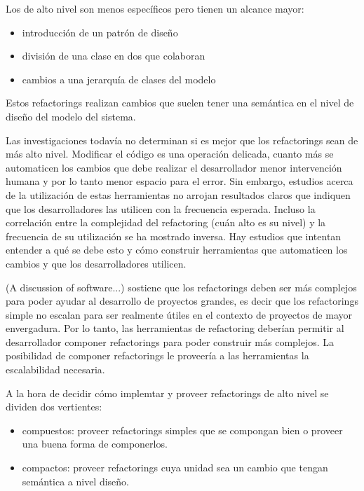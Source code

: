 Los de alto nivel son menos específicos pero tienen un alcance mayor:

\begin{itemize}
    \item introducción de un patrón de diseño
    \item división de una clase en dos que colaboran
    \item cambios a una jerarquía de clases del modelo
\end{itemize}

Estos refactorings realizan cambios que suelen tener una semántica en el nivel de diseño del modelo
del sistema.

Las investigaciones todavía no determinan si es mejor que los refactorings sean de más alto nivel.
Modificar el código es una operación delicada, cuanto más se automaticen los cambios que debe
realizar el desarrollador menor intervención humana y por lo tanto menor espacio para el error. Sin
embargo, estudios acerca de la utilización de estas herramientas no arrojan resultados claros que
indiquen que los desarrolladores las utilicen con la frecuencia esperada. Incluso la correlación
entre la complejidad del refactoring (cuán alto es su nivel) y la frecuencia de su utilización se ha
mostrado inversa. Hay estudios que intentan entender a qué se debe esto y cómo construir
herramientas que automaticen los cambios y que los desarrolladores utilicen.

(A discussion of software...) sostiene que los refactorings deben ser más complejos para poder
ayudar al desarrollo de proyectos grandes, es decir que los refactorings simple no escalan para ser
realmente útiles en el contexto de proyectos de mayor envergadura. Por lo tanto, las herramientas de
refactoring deberían permitir al desarrollador componer refactorings para poder construir más
complejos. La posibilidad de componer refactorings le proveería a las herramientas la escalabilidad
necesaria.

A la hora de decidir cómo implemtar y proveer refactorings de alto nivel se dividen dos vertientes:

\begin{itemize}
    \item compuestos: proveer refactorings simples que se compongan bien o proveer una buena forma
    de componerlos.
    \item compactos: proveer refactorings cuya unidad sea un cambio que tengan semántica a nivel
    diseño.
\end{itemize}

